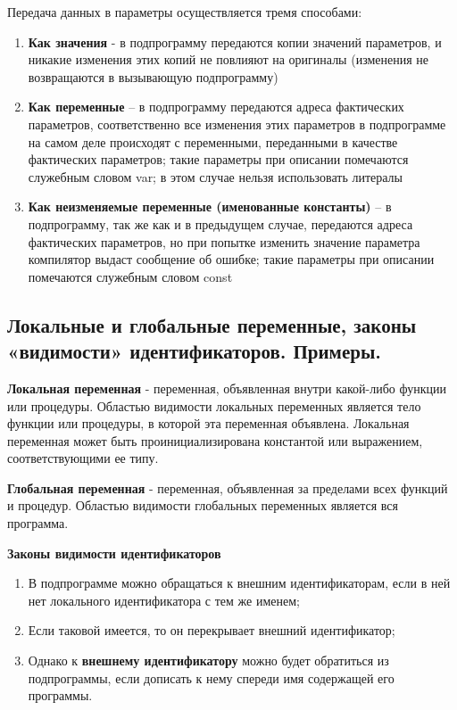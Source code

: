 Передача данных в параметры осуществляется тремя способами:
\begin{enumerate}
    \item	{\bf Как значения} -  в подпрограмму передаются копии значений параметров, и никакие изменения этих копий не повлияют на оригиналы (изменения не возвращаются в вызывающую подпрограмму)
    \item	{\bf Как переменные} – в подпрограмму передаются адреса фактических параметров, соответственно все изменения этих параметров в подпрограмме на самом деле происходят с переменными, переданными в качестве фактических параметров; такие параметры при описании помечаются служебным словом var; в этом случае нельзя использовать литералы
    \item	{\bf Как неизменяемые переменные (именованные константы)} – в подпрограмму, так же как и в предыдущем случае, передаются адреса фактических параметров, но при попытке изменить значение параметра компилятор выдаст сообщение об ошибке; такие параметры при описании помечаются служебным словом const
\end{enumerate}




\newpage\subsection{Локальные и глобальные переменные, законы «видимости» идентификаторов. Примеры. }

\begin{myquote}

\end{myquote}

{\bf{Локальная переменная}} - переменная, объявленная внутри какой-либо функции или процедуры. Областью видимости локальных переменных является тело функции или процедуры, в которой эта переменная объявлена. Локальная переменная может быть проинициализирована константой или выражением, соответствующими ее типу.

{\bf{Глобальная переменная}} - переменная, объявленная за пределами всех функций и процедур. Областью видимости глобальных переменных является вся программа.



{\bf{Законы видимости идентификаторов}}

\begin{enumerate}
    
\item В подпрограмме можно обращаться к внешним идентификаторам, если в ней нет локального идентификатора с тем же именем;
\item Если таковой имеется, то он перекрывает внешний идентификатор;
\item Однако к {\bf внешнему идентификатору} можно будет обратиться из подпрограммы, если дописать к нему спереди имя содержащей его программы.

\end{enumerate}

